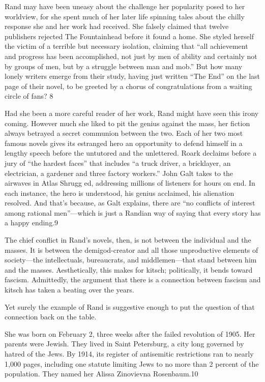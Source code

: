  \par 
Rand may have been uneasy about the challenge her popularity posed to her worldview, for she spent much of her later life spinning tales about the chilly response she and her work had received. She falsely claimed that twelve publishers rejected The Fountainhead before it found a home. She styled herself the victim of a terrible but necessary isolation, claiming that “all achievement and progress has been accomplished, not just by men of ability and certainly not by groups of men, but by a struggle between man and mob.” But how many lonely writers emerge from their study, having just written “The End” on the last page of their novel, to be greeted by a chorus of congratulations from a waiting circle of fans? {\color{blue}8}
 \par 
Had she been a more careful reader of her work, Rand might have seen this irony coming. However much she liked to pit the genius against the mass, her fiction always betrayed a secret communion between the two. Each of her two most famous novels gives its estranged hero an opportunity to defend himself in a lengthy speech before the untutored and the unlettered. Roark declaims before a jury of “the hardest faces” that includes “a truck driver, a bricklayer, an electrician, a gardener and three factory workers.” John Galt takes to the airwaves in Atlas Shrugg ed, addressing millions of listeners for hours on end. In each instance, the hero is understood, his genius acclaimed, his alienation resolved. And that’s because, as Galt explains, there are “no conflicts of interest among rational men”—which is just a Randian way of saying that every story has a happy ending.{\color{blue}9}
 \par 
The chief conflict in Rand’s novels, then, is not between the individual and the masses. It is between the demigod-creator and all those unproductive elements of society—the intellectuals, bureaucrats, and middlemen—that stand between him and the masses. Aesthetically, this makes for kitsch; politically, it bends toward fascism. Admittedly, the argument that there is a connection between fascism and kitsch has taken a beating over the years.
 \par 
Yet surely the example of Rand is suggestive enough to put the question of that connection back on the table.
 \par 
She was born on February 2, three weeks after the failed revolution of 1905. Her parents were Jewish. They lived in Saint Petersburg, a city long governed by hatred of the Jews. By 1914, its register of antisemitic restrictions ran to nearly 1,000 pages, including one statute limiting Jews to no more than {\color{blue}2} percent of the population. They named her Alissa Zinovievna Rosenbaum.{\color{blue}10}
